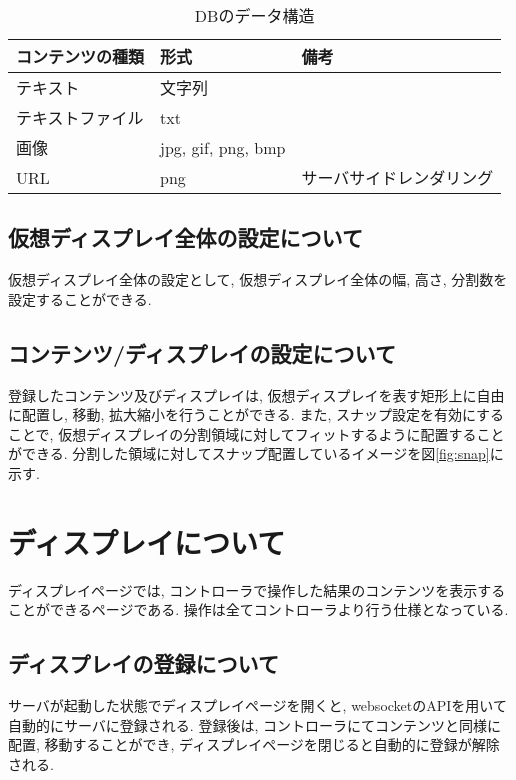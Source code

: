 \documentclass[a4paper,10pt,oneside]{jsbook}
\begin{document}
\begin{table}[htbp]
\begin{center}
\caption{DBのデータ構造}
\label{dbstructure}
\begin{tabular}{|l|l|l|}
\hline
コンテンツの種類 & 形式 & 備考 \\
\hline
\hline
テキスト & 文字列 & \\
\hline
テキストファイル & txt & \\
\hline
画像	& jpg, gif, png, bmp & \\
\hline
URL	& png & サーバサイドレンダリング \\
\hline

\end{tabular}
\end{center}
\end{table}

\section{仮想ディスプレイ全体の設定について}
仮想ディスプレイ全体の設定として, 仮想ディスプレイ全体の幅, 高さ, 分割数を設定することができる. 

\section{コンテンツ/ディスプレイの設定について}
登録したコンテンツ及びディスプレイは, 仮想ディスプレイを表す矩形上に自由に配置し, 移動, 拡大縮小を行うことができる. また, スナップ設定を有効にすることで, 仮想ディスプレイの分割領域に対してフィットするように配置することができる.
分割した領域に対してスナップ配置しているイメージを図\ref{fig:snap}に示す. 



\chapter{ディスプレイについて}
ディスプレイページでは, コントローラで操作した結果のコンテンツを表示することができるページである. 操作は全てコントローラより行う仕様となっている.

\section{ディスプレイの登録について}
サーバが起動した状態でディスプレイページを開くと, websocketのAPIを用いて自動的にサーバに登録される. 登録後は, コントローラにてコンテンツと同様に配置, 移動することができ, ディスプレイページを閉じると自動的に登録が解除される. 
\end{document}
